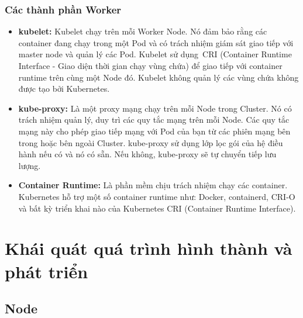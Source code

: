 \documentclass[12pt,a4paper]{report}
\begin{document}
	\subsubsection{Các thành phần Worker}
	
	\hspace{1cm}{Có nhiệm vụ xử lý khối lượng công việc của application trong cluster, duy trì các nhóm đang chạy và cung cấp môi trường runtime cho Kubernetes. Worker sẽ bao gồm 3 thành phần chính sau:}
	\begin{itemize}
		\item \textbf{kubelet:}
		\smallskip
		\subitem
		Kubelet chạy trên mỗi Worker Node. Nó đảm bảo rằng các container đang chạy trong một Pod và có trách nhiệm giám sát giao tiếp với master node và quản lý các Pod. Kubelet sử dụng CRI (Container Runtime Interface - Giao diện thời gian chạy vùng chứa) để giao tiếp với container runtime trên cùng một Node đó. Kubelet không quản lý các vùng chứa không được tạo bởi Kubernetes.
		
		\item \textbf{kube-proxy:}
		\smallskip
		\subitem
		Là một proxy mạng chạy trên mỗi Node trong Cluster. Nó có trách nhiệm quản lý, duy trì các quy tắc mạng trên mỗi Node. Các quy tắc mạng này cho phép giao tiếp mạng với Pod của bạn từ các phiên mạng bên trong hoặc bên ngoài Cluster. kube-proxy sử dụng lớp lọc gói của hệ điều hành nếu có và nó có sẵn. Nếu không, kube-proxy sẽ tự chuyển tiếp lưu lượng.
		
		\item \textbf{Container Runtime:}
		\smallskip
		\subitem
		Là phần mềm chịu trách nhiệm chạy các container. Kubernetes hỗ trợ một số container runtime như: Docker, containerd, CRI-O và bất kỳ triển khai nào của Kubernetes CRI (Container Runtime Interface).
	\end{itemize}
	
	\section{Khái quát quá trình hình thành và phát triển}
	
	\subsection{Node}
	
		\hspace{1cm}{Kubernetes chạy khối lượng công việc bằng cách đặt các container vào các Pod để chạy trên các Node. Một Node có thể là một máy ảo hoặc vật lý, tùy thuộc vào cụm. Mỗi Node được quản lý bởi control plane và chứa các dịch vụ cần thiết để chạy các Pod.\\}
	
\end{document}
